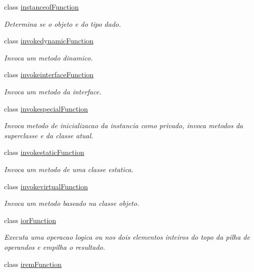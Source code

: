 \begin{DoxyCompactItemize}
class \hyperlink{classInstruction_1_1instanceofFunction}{instanceof\+Function}
\begin{DoxyCompactList}\small\item\em Determina se o objeto e do tipo dado. \end{DoxyCompactList}\item 
class \hyperlink{classInstruction_1_1invokedynamicFunction}{invokedynamic\+Function}
\begin{DoxyCompactList}\small\item\em Invoca um metodo dinamico. \end{DoxyCompactList}\item 
class \hyperlink{classInstruction_1_1invokeinterfaceFunction}{invokeinterface\+Function}
\begin{DoxyCompactList}\small\item\em Invoca um metodo da interface. \end{DoxyCompactList}\item 
class \hyperlink{classInstruction_1_1invokespecialFunction}{invokespecial\+Function}
\begin{DoxyCompactList}\small\item\em Invoca metodo de inicializacao da instancia como privado, invoca metodos da superclasse e da classe atual. \end{DoxyCompactList}\item 
class \hyperlink{classInstruction_1_1invokestaticFunction}{invokestatic\+Function}
\begin{DoxyCompactList}\small\item\em Invoca um metodo de uma classe estatica. \end{DoxyCompactList}\item 
class \hyperlink{classInstruction_1_1invokevirtualFunction}{invokevirtual\+Function}
\begin{DoxyCompactList}\small\item\em Invoca um metodo baseado na classe objeto. \end{DoxyCompactList}\item 
class \hyperlink{classInstruction_1_1iorFunction}{ior\+Function}
\begin{DoxyCompactList}\small\item\em Executa uma operacao logica \textquotesingle{}ou\textquotesingle{} nos dois elementos inteiros do topo da pilha de operandos e empilha o resultado. \end{DoxyCompactList}\item 
class \hyperlink{classInstruction_1_1iremFunction}{irem\+Function}

\end{DoxyCompactItemize}
